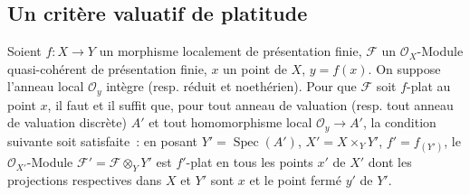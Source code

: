 \subsection{Un critère valuatif de platitude}
\label{subsection:IV.11.8-fr}

\begin{theorem}[11.8.1]
\label{IV.11.8.1-fr}
Soient $f:X\to Y$ un morphisme localement de présentation finie, $\mathcal F$ un
$\mathcal O_X$-Module quasi-cohérent de présentation finie, $x$ un point de
$X$, $y=f(x)$. On suppose l'anneau local $\mathcal O_y$ intègre (resp. réduit et
noethérien). Pour que $\mathcal F$ soit $f$-plat au point $x$, il faut et il
suffit que, pour tout anneau de valuation (resp. tout anneau de valuation
discrète) $A'$ et tout homomorphisme local $\mathcal O_y\to A'$, la condition
suivante soit satisfaite~: en posant $Y'=\operatorname{Spec}(A')$,
$X'=X\times_Y Y'$, $f'=f_{(Y')}$, le $\mathcal O_{X'}$-Module
$\mathcal F'=\mathcal F\otimes_Y Y'$ est $f'$-plat en tous les points $x'$ de
$X'$ dont les projections respectives dans $X$ et $Y'$ sont $x$ et le point
fermé $y'$ de $Y'$.
\end{theorem}

